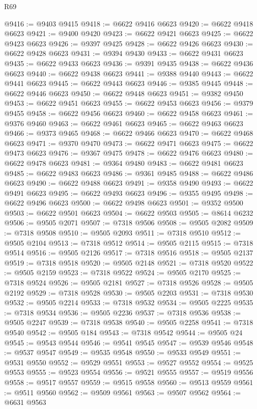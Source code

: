 \begin{lexlean}{R69}
\begin{coremodule}
{@9416 := @9403 @9415
@9418 := @6622 @9416 @6623
@9420 := @6622 @9418 @6623
@9421 := @9400 @9420
@9423 := @6622 @9421 @6623
@9425 := @6622 @9423 @6623
@9426 := @9397 @9425
@9428 := @6622 @9426 @6623
@9430 := @6622 @9428 @6623
@9431 := @9394 @9430
@9433 := @6622 @9431 @6623
@9435 := @6622 @9433 @6623
@9436 := @9391 @9435
@9438 := @6622 @9436 @6623
@9440 := @6622 @9438 @6623
@9441 := @9388 @9440
@9443 := @6622 @9441 @6623
@9445 := @6622 @9443 @6623
@9446 := @9385 @9445
@9448 := @6622 @9446 @6623
@9450 := @6622 @9448 @6623
@9451 := @9382 @9450
@9453 := @6622 @9451 @6623
@9455 := @6622 @9453 @6623
@9456 := @9379 @9455
@9458 := @6622 @9456 @6623
@9460 := @6622 @9458 @6623
@9461 := @9376 @9460
@9463 := @6622 @9461 @6623
@9465 := @6622 @9463 @6623
@9466 := @9373 @9465
@9468 := @6622 @9466 @6623
@9470 := @6622 @9468 @6623
@9471 := @9370 @9470
@9473 := @6622 @9471 @6623
@9475 := @6622 @9473 @6623
@9476 := @9367 @9475
@9478 := @6622 @9476 @6623
@9480 := @6622 @9478 @6623
@9481 := @9364 @9480
@9483 := @6622 @9481 @6623
@9485 := @6622 @9483 @6623
@9486 := @9361 @9485
@9488 := @6622 @9486 @6623
@9490 := @6622 @9488 @6623
@9491 := @9358 @9490
@9493 := @6622 @9491 @6623
@9495 := @6622 @9493 @6623
@9496 := @9355 @9495
@9498 := @6622 @9496 @6623
@9500 := @6622 @9498 @6623
@9501 := @9352 @9500
@9503 := @6622 @9501 @6623
@9504 := @6622 @9503
@9505 := @8614 @6232
@9506 := @9505 @2071
@9507 := @7318 @9506
@9508 := @9505 @2082
@9509 := @7318 @9508
@9510 := @9505 @2093
@9511 := @7318 @9510
@9512 := @9505 @2104
@9513 := @7318 @9512
@9514 := @9505 @2115
@9515 := @7318 @9514
@9516 := @9505 @2126
@9517 := @7318 @9516
@9518 := @9505 @2137
@9519 := @7318 @9518
@9520 := @9505 @2148
@9521 := @7318 @9520
@9522 := @9505 @2159
@9523 := @7318 @9522
@9524 := @9505 @2170
@9525 := @7318 @9524
@9526 := @9505 @2181
@9527 := @7318 @9526
@9528 := @9505 @2192
@9529 := @7318 @9528
@9530 := @9505 @2203
@9531 := @7318 @9530
@9532 := @9505 @2214
@9533 := @7318 @9532
@9534 := @9505 @2225
@9535 := @7318 @9534
@9536 := @9505 @2236
@9537 := @7318 @9536
@9538 := @9505 @2247
@9539 := @7318 @9538
@9540 := @9505 @2258
@9541 := @7318 @9540
@9542 := @9505 @184
@9543 := @7318 @9542
@9544 := @9505 @24
@9545 := @9543 @9544
@9546 := @9541 @9545
@9547 := @9539 @9546
@9548 := @9537 @9547
@9549 := @9535 @9548
@9550 := @9533 @9549
@9551 := @9531 @9550
@9552 := @9529 @9551
@9553 := @9527 @9552
@9554 := @9525 @9553
@9555 := @9523 @9554
@9556 := @9521 @9555
@9557 := @9519 @9556
@9558 := @9517 @9557
@9559 := @9515 @9558
@9560 := @9513 @9559
@9561 := @9511 @9560
@9562 := @9509 @9561
@9563 := @9507 @9562
@9564 := @6631 @9563
}
\end{coremodule}
\end{lexlean}
